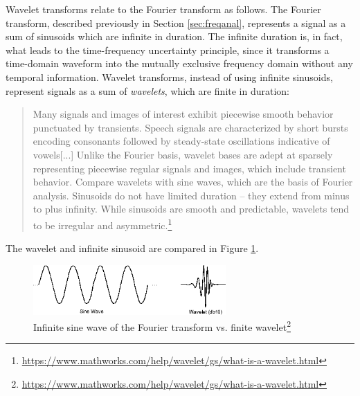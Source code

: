 \documentclass[report.tex]{subfiles}
\begin{document}
Wavelet transforms relate to the Fourier transform as follows. The Fourier transform, described previously in Section \ref{sec:freqanal}, represents a signal as a sum of sinusoids which are infinite in duration. The infinite duration is, in fact, what leads to the time-frequency uncertainty principle, since it transforms a time-domain waveform into the mutually exclusive frequency domain without any temporal information. Wavelet transforms, instead of using infinite sinusoids, represent signals as a sum of \textit{wavelets}, which are finite in duration:

\begin{quote}
       Many signals and images of interest exhibit piecewise smooth behavior punctuated by transients. Speech signals are characterized by short bursts encoding consonants followed by steady-state oscillations indicative of vowels[...] Unlike the Fourier basis, wavelet bases are adept at sparsely representing piecewise regular signals and images, which include transient behavior. Compare wavelets with sine waves, which are the basis of Fourier analysis. Sinusoids do not have limited duration -- they extend from minus to plus infinity. While sinusoids are smooth and predictable, wavelets tend to be irregular and asymmetric.\footnote{\url{https://www.mathworks.com/help/wavelet/gs/what-is-a-wavelet.html}}
\end{quote}

The wavelet and infinite sinusoid are compared in Figure \ref{fig:waveletinf}.

\begin{figure}[ht]
       \centering
        \begin{minipage}{1.\textwidth}
               \renewcommand\footnoterule{} %
               \renewcommand{\thempfootnote}{\fnsymbol{mpfootnote}}
               \includegraphics[width=0.65635\textwidth]{./images-wavelets/wavelet.png}
               \caption[Infinite sine wave of the Fourier transform vs. finite wavelet]{Infinite sine wave of the Fourier transform vs. finite wavelet\footnote[1]{\url{https://www.mathworks.com/help/wavelet/gs/what-is-a-wavelet.html}}}
               \label{fig:waveletinf}
       \end{minipage}
\end{figure}
\end{document}
